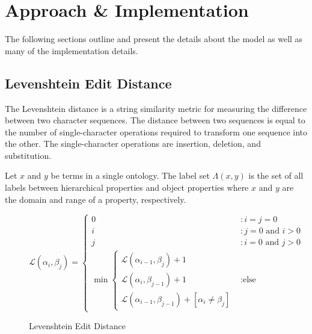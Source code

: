 \documentclass[letterpaper,twocolumn,12pt]{article}
\begin{document}
\section{Approach \& Implementation}
\label{sec:approach}

The following sections outline and present the details about the model as well as 
many of the implementation details.

\subsection{Levenshtein Edit Distance}

The Levenshtein distance is a string similarity metric for measuring the difference 
between two character sequences. 
The distance between two sequences is equal to the number of single-character 
operations required to transform one sequence into the other. 
The single-character operations are insertion, deletion, and substitution.

\begin{defn}
Let $x$ and $y$ be terms in a single ontology. The label set $\Lambda \left( x, y \right)$ is the set of all labels between hierarchical properties and object properties where $x$ and $y$ are the domain and range of a property, respectively.
\end{defn}

\begin{figure*}
\centering
\begin{equation*}
\mathcal{L} 
\left( \alpha_i, \beta_j \right) = \left\{
	\begin{array}{ll}
   	 	0 &: i=j=0 \\
		i &: j = 0 \text{ and } i > 0 \\
		j &: i = 0 \text{ and } j > 0 \\
		\min 
			\left\{ 
			\begin{array}{l}
				\mathcal{L} \left( \alpha_{i-1}, \beta_j \right) + 1 \\
          		        \mathcal{L} \left( \alpha_i, \beta_{j-1} \right) + 1 \\
          		        \mathcal{L} \left( \alpha_{i-1}, \beta_{j-1} \right) + [\alpha_i \neq \beta_j]
			\end{array} \right. &: \text{else}
     \end{array}
\right.
\end{equation*}
\caption{Levenshtein Edit Distance}
\end{figure*}
\end{document}
